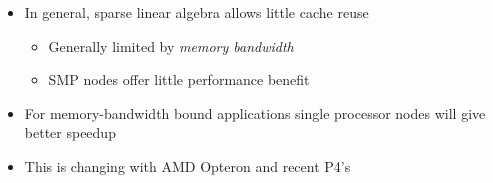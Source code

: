 \documentclass[compress,12pt]{beamer}
\begin{document}
\begin{frame}%

\begin{itemize}

\item In general, sparse linear algebra allows little cache reuse
  \begin{itemize}
  \item Generally limited by \emph{memory bandwidth}
  \item SMP nodes offer little performance benefit
  \end{itemize}
\item For memory-bandwidth bound applications single processor nodes will give better speedup
\item This is changing with AMD Opteron and recent P4's
\end{itemize}

\tiny


\end{frame}
\end{document}
